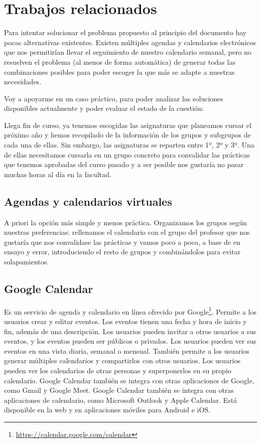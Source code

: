 \section{Trabajos relacionados}

Para intentar solucionar el problema propuesto al principio del documento hay pocas alternativas existentes. Existen múltiples agendas y calendarios electrónicos que nos permitirían llevar el seguimiento de nuestro calendario semanal, pero no resuelven el problema (al menos de forma automática) de generar todas las combinaciones posibles para poder escoger la que más se adapte a nuestras necesidades.\newline

Voy a apoyarme en un caso práctico, para poder analizar las soluciones disponibles actualmente y poder evaluar el estado de la cuestión:\newline

Llega fin de curso, ya tenemos escogidas las asignaturas que planeamos cursar el próximo año y hemos recopilado de la información de los grupos y subgrupos de cada una de ellas. Sin embargo, las asignaturas se reparten entre 1º, 2º y 3º. Una de ellas necesitamos cursarla en un grupo concreto para convalidar las prácticas que tenemos aprobadas del curso pasado y a ser posible nos gustaría no pasar muchas horas al día en la facultad.

\subsection{Agendas y calendarios virtuales}
A priori la opción más simple y menos práctica. Organizamos los grupos según nuestras preferencias: rellenamos el calendario con el grupo del profesor que nos gustaría que nos convalidase las prácticas y vamos poco a poco, a base de en ensayo y error, introduciendo el resto de grupos y combinándolos para evitar solapamientos.

\subsection{Google Calendar}
Es un servicio de agenda y calendario en línea ofrecido por Google\footnote{\url{https://calendar.google.com/calendar}}.  Permite a los usuarios crear y editar eventos. Los eventos tienen una fecha y hora de inicio y fin, además de una descripción. Los usuarios pueden invitar a otros usuarios a sus eventos, y los eventos pueden ser públicos o privados. Los usuarios pueden ver sus eventos en una vista diaria, semanal o mensual. También permite a los usuarios generar múltiples calendarios y compartirlos con otros usuarios. Los usuarios pueden ver los calendarios de otras personas y superponerlos en su propio calendario. Google Calendar también se integra con otras aplicaciones de Google, como Gmail y Google Meet. Google Calendar también se integra con otras aplicaciones de calendario, como Microsoft Outlook y Apple Calendar. Está disponible en la web y en aplicaciones móviles para Android e iOS.


